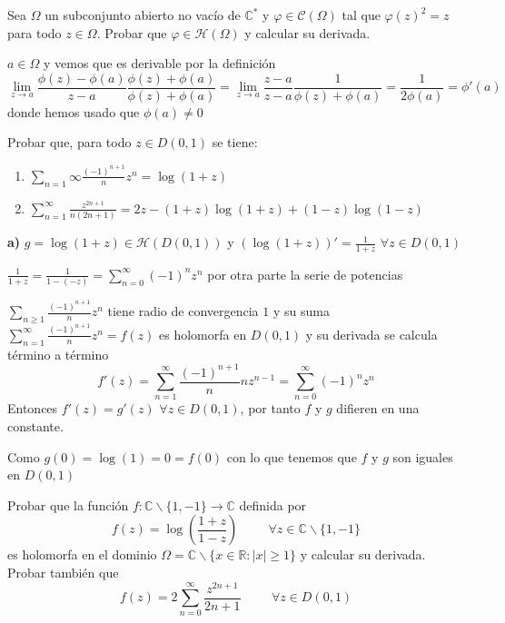 \begin{ejer}
	Sea $\Omega$ un subconjunto abierto no vacío de $\mathbb{C}^{\ast}$ y $\varphi\in\mathcal{C}(\Omega)$ tal que $\varphi(z)^2 = z$ para todo $z\in\Omega$. Probar que $\varphi\in\mathcal{H}(\Omega)$ y calcular su derivada.
\end{ejer}

\begin{sol}
$a\in\Omega$ y vemos que es derivable por la definición
$$\lim_{z\rightarrow a} \frac{\phi(z)-\phi(a)}{z-a} \frac{\phi(z)+\phi(a)}{\phi(z)+\phi(a)} = \lim_{z\rightarrow a} \frac{z-a}{z-a} \frac{1}{\phi(z)+\phi(a)} = \frac{1}{2\phi(a)} = \phi '(a)$$
donde hemos usado que $\phi(a)\not = 0$

\end{sol}



\begin{ejer}
	Probar que, para todo $z \in D(0, 1)$ se tiene:
	\begin{enumerate}[label=(\alph*)]
		\item $\sum_{n=1}{\infty} \frac{(-1)^{n+1}}{n} z^n = \log(1+z)$
		\item $\sum_{n=1}^{\infty} \frac{z^{2n+1}}{n(2n+1)} = 2z-(1+z)\log(1+z)+(1-z)\log(1-z)$
	\end{enumerate}
\end{ejer}

\begin{sol}

\textbf{a)}
$g = \log (1+z) \in\mathcal{H}(D(0,1))$ y $(\log (1+z))' = \frac{1}{1+z}$ $\forall z\in D(0,1)$

$\frac{1}{1+z} = \frac{1}{1-(-z)} = \sum_{n=0}^{\infty} (-1)^n z^n$
por otra parte la serie de potencias 

$\sum_{n\geq 1} \frac{(-1)^{n+1}}{n} z^n$ tiene radio de convergencia $1$
y su suma $\sum_{n=1}^{\infty} \frac{(-1)^{n+1}}{n} z^n = f(z)$ es holomorfa en $D(0,1)$ y su derivada se calcula término a término
$$f'(z) = \sum_{n=1}^{\infty} \frac{(-1)^{n+1}}{n} n z^{n-1} = \sum_{n=0}^{\infty} (-1)^{n}z^{n}$$
Entonces $f'(z) = g'(z)$ $\forall z\in D(0,1)$, por tanto $f$ y $g$ difieren en una constante.

Como $g(0) = \log(1) = 0 = f(0)$
con lo que tenemos que $f$ y $g$ son iguales en $D(0,1)$

\end{sol}




\begin{ejer}
	Probar que la función $f:\mathbb{C}\backslash\{1,-1\}\rightarrow\mathbb{C}$ definida por
	$$ f(z) = \log\left( \frac{1+z}{1-z} \right) \hspace{1cm} \forall z\in\mathbb{C}\backslash\{1,-1\} $$
	es holomorfa en el dominio $\Omega = \mathbb{C}\backslash\{ x\in\mathbb{R} : |x|\geq 1 \}$ y calcular su derivada. Probar también que
	$$ f(z) = 2\sum_{n=0}^{\infty} \frac{z^{2n+1}}{2n+1} \hspace{1cm} \forall z\in D(0,1) $$
\end{ejer}


